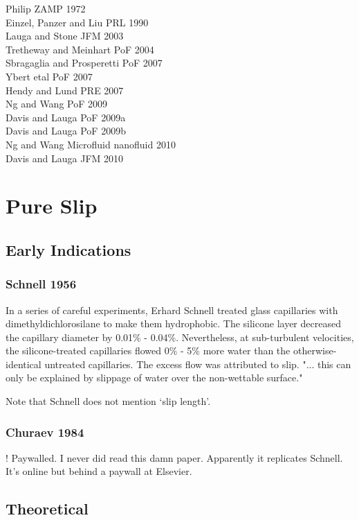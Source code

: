 \documentclass[twocolumn]{article}
\begin{document}
\begin{itemize}
Philip ZAMP 1972 \\
Einzel, Panzer and Liu PRL 1990 \\
Lauga and Stone JFM 2003 \\
Tretheway and Meinhart  PoF 2004 \\
Sbragaglia and Prosperetti PoF 2007 \\
Ybert etal PoF 2007 \\
Hendy and Lund PRE 2007 \\
Ng and Wang PoF 2009 \\
Davis and Lauga PoF 2009a \\
Davis and Lauga PoF 2009b \\
Ng and Wang Microfluid nanofluid 2010 \\
Davis and Lauga JFM 2010 \\

\end{itemize}

\section*{Pure Slip}

\subsection*{Early Indications}

\subsubsection*{Schnell 1956}
In a series of careful experiments, Erhard Schnell treated glass capillaries with dimethyldichlorosilane to make them hydrophobic. The silicone layer decreased the capillary diameter by 0.01\% - 0.04\%. Nevertheless, at sub-turbulent velocities, the silicone-treated capillaries flowed 0\% - 5\% more water than the otherwise-identical untreated capillaries.  The excess flow was attributed to slip. "... this can only be explained by slippage of water over the non-wettable surface."

Note that Schnell does not mention `slip length'.

\subsubsection*{Churaev 1984}
! Paywalled.
I never did read this damn paper.  Apparently it replicates Schnell.  It's online but behind a paywall at Elsevier.

\subsection*{Theoretical}
\end{document}
